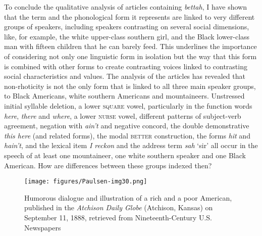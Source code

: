 To conclude the qualitative analysis of articles containing \emph{bettah}, I have shown that the term and the phonological form it represents are linked to very different groups of speakers, including  speakers contrasting on several social dimensions, like, for example, the white upper-class southern girl, and the Black lower-class man with fifteen children that he can barely feed. This underlines the importance of considering not only one linguistic form in isolation but the way that this form is combined with other forms to create contrasting voices linked to contrasting social characteristics and values. The analysis of the articles has revealed that non-rhoticity is not the only form that is linked to all three main speaker groups, to Black Americans, white southern Americans and mountaineers. Unstressed initial syllable deletion, a lower \textsc{square} vowel, particularly in the function words \emph{here}, \emph{there} and \emph{where}, a lower \textsc{nurse} vowel, different patterns of subject-verb agreement, negation with \emph{ain’t} and negative concord, the double demonstrative \emph{this here} (and related forms), the modal \textsc{better} construction, the forms \emph{hit} and \emph{hain’t}, and the lexical item \emph{I reckon} and the address term \emph{sah} ‘sir’ all occur in the speech of at least one mountaineer, one white southern speaker and one Black American. How are differences between these groups indexed then?



\begin{figure}[b]
\texttt{[image: figures/Paulsen-img30.png]}
\caption{
Humorous dialogue and illustration of a rich and a poor American, published in the \emph{Atchison Daily Globe} (Atchison, Kansas) on September 11, 1888, retrieved from Nineteenth-Century U.S. Newspapers
}
\label{fig:key:30}
\end{figure}

